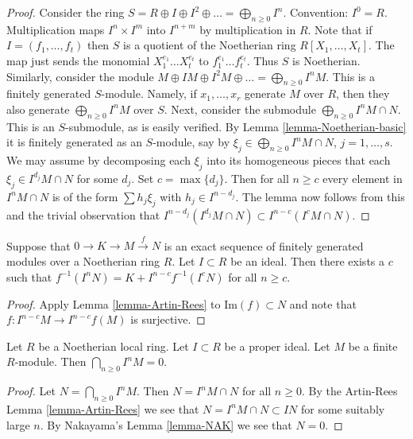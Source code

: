 \begin{proof}
Consider the ring $S = R \oplus I \oplus I^2 \oplus \ldots
= \bigoplus_{n \geq 0} I^n$. Convention: $I^0 = R$.
Multiplication maps $I^n \times I^m$
into $I^{n + m}$ by multiplication in $R$.
Note that if $I = (f_1, \ldots, f_t)$
then $S$ is a quotient of the Noetherian ring $R[X_1, \ldots, X_t]$.
The map just sends the monomial $X_1^{e_1}\ldots X_t^{e_t}$
to $f_1^{e_1}\ldots f_t^{e_t}$. Thus $S$ is Noetherian.
Similarly, consider the module $M \oplus IM \oplus I^2M \oplus \ldots
= \bigoplus_{n \geq 0} I^nM$. This is a finitely generated $S$-module.
Namely, if $x_1, \ldots, x_r$ generate $M$ over $R$, then they also generate
$\bigoplus_{n \geq 0} I^nM$ over $S$. Next, consider the
submodule $\bigoplus_{n \geq 0} I^nM \cap N$.
This is an $S$-submodule, as is easily verified. By
Lemma \ref{lemma-Noetherian-basic} it is finitely generated as
an $S$-module,
say by $\xi_j \in \bigoplus_{n \geq 0} I^nM \cap N$, $j = 1, \ldots, s$.
We may assume by decomposing each $\xi_j$ into its homogeneous
pieces that each $\xi_j \in I^{d_j}M \cap N$ for some $d_j$.
Set $c = \max\{d_j\}$. Then for all $n \geq c$ every element
in $I^nM \cap N$ is of the form $\sum h_j \xi_j$ with
$h_j \in I^{n - d_j}$. The lemma now follows from this and the trivial
observation that $I^{n-d_j}(I^{d_j}M \cap N) \subset I^{n-c}(I^cM \cap N)$.
\end{proof}

\begin{lemma}
\label{lemma-map-AR}
Suppose that $0 \to K \to M \xrightarrow{f} N$ is an
exact sequence of finitely generated modules
over a Noetherian ring $R$. Let $I \subset R$ be an ideal.
Then there exists a $c$ such that $f^{-1}(I^nN)
= K + I^{n-c}f^{-1}(I^cN)$ for all $n \geq c$.
\end{lemma}

\begin{proof}
Apply Lemma \ref{lemma-Artin-Rees} to
$\text{Im}(f) \subset N$ and note that
$f : I^{n-c}M \to I^{n-c}f(M)$ is surjective.
\end{proof}

\begin{lemma}
\label{lemma-intersect-powers-ideal-module-zero}
Let $R$ be a Noetherian local ring. Let $I \subset R$ be
a proper ideal. Let $M$ be a finite $R$-module.
Then $\bigcap_{n \geq 0} I^nM = 0$.
\end{lemma}

\begin{proof}
Let $N = \bigcap_{n \geq 0} I^nM$.
Then $N = I^nM \cap N$ for all $n \geq 0$.
By the Artin-Rees Lemma \ref{lemma-Artin-Rees}
we see that $N = I^nM \cap N \subset IN$ for
some suitably large $n$. By Nakayama's Lemma \ref{lemma-NAK}
we see that $N = 0$.
\end{proof}

